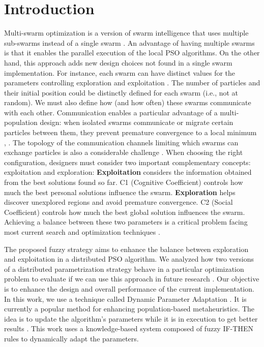 \documentclass[graybox]{svmult}
\begin{document}
\section{Introduction}
Multi-swarm optimization is a version of swarm intelligence that uses multiple sub-swarms instead of a single swarm \cite{jain2022overview}. An advantage of having multiple swarms is that it enables the parallel execution of the local PSO algorithms.
On the other hand, this approach adds new design choices not found in a single swarm implementation. For instance, each swarm can have distinct values for the parameters controlling exploration and exploitation \cite{shi2001fuzzy}. The number of particles and their initial position could be distinctly defined for each swarm (i.e., not at random).
We must also define how (and how often) these swarms communicate with each other. Communication enables a particular advantage of a multi-population design: when isolated swarms communicate or migrate certain particles between them, they prevent premature convergence to a local minimum \cite{xia2018multi}, \cite{kennedy2006swarm}. The topology of the communication channels limiting which swarms can exchange particles is also a considerable challenge \cite{miramontes2022interval}. When choosing the right configuration, designers must consider two important complementary concepts: exploitation and exploration:
\textbf{Exploitation} considers the information obtained from the best solutions found so far.  
C1 (Cognitive Coefficient) controls how much the best personal  solutions influence the swarm. 
\textbf{Exploration} helps discover unexplored regions and avoid premature convergence. 
C2 (Social Coefficient) controls how much the best global solution influences the swarm.
Achieving a balance between these two parameters is a critical problem facing most current search and optimization techniques \cite{vargas2011estrategias}. 

The proposed fuzzy strategy aims to enhance the balance between exploration and exploitation in a distributed PSO algorithm. We analyzed how two versions of a distributed parametrization strategy behave in a particular optimization problem \cite{garcia2023distributed} to evaluate if we can use this approach in future research \cite{clerc2010particle}. Our objective is to enhance the design and overall performance of the current implementation. In this work, we use a technique called Dynamic Parameter Adaptation \cite{olivas2016dynamic}. It is currently a popular method for enhancing population-based metaheuristics. The idea is to update the algorithm's parameters while it is in execution to get better results \cite{mancilla2023optimization}. This work uses a knowledge-based system composed of fuzzy IF-THEN rules to dynamically adapt the parameters.
\end{document}
